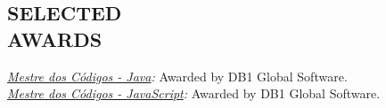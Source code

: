 \documentclass[line,margin]{res}
\begin{document}
\begin{resume}
\section{SELECTED \\ AWARDS}             
  {\sl \href{https://mestredoscodigos.com.br/primeira-entrega-dos-pins-do-mestre-dos-codigos}{Mestre dos C\'odigos - Java}:} Awarded by DB1 Global Software.\\
  {\sl \href{https://mestredoscodigos.com.br/primeira-entrega-dos-pins-do-mestre-dos-codigos}{Mestre dos C\'odigos - JavaScript}:} Awarded by DB1 Global Software.\\
 

\end{resume}
\end{document}
